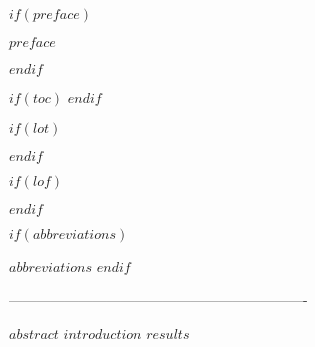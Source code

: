 \documentclass[11pt, a4paper, twoside]{MPIthesis} %
\begin{document}
$if(preface)$
  \begin{preface}
    $preface$
  \end{preface}
$endif$

$if(toc)$
  \pagestyle{fancy}
  \fancyfoot{}
  \hypersetup{linkcolor=$if(toccolor)$$toccolor$$else$black$endif$}
  \setcounter{tocdepth}{$toc-depth$}
  \tableofcontents
$endif$

$if(lot)$
  \fancyfoot{}
  \listoftables %
$endif$

$if(lof)$
  \fancyfoot{}
  \listoffigures
$endif$

$if(abbreviations)$

  \fancyfoot{}
  $abbreviations$
$endif$

 ----------------------------------------------------------------




\mainmatter %

\pagestyle{fancy} %
$abstract$
$introduction$
%
$results$

%

\end{document}
